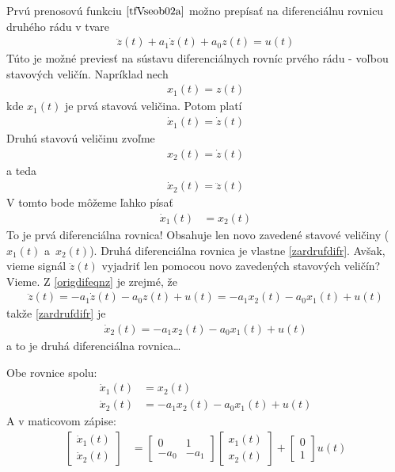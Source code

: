 \documentclass[a4paper, 10pt, ]{article}
\begin{document}
Prvú prenosovú funkciu $\eqref{tfVseob02a}$ možno prepísať na diferenciálnu rovnicu druhého rádu v tvare
\begin{align} \label{origdifeqnz}
	\ddot z(t) + a_1 \dot z(t) + a_0 z(t) = u(t)
\end{align}
Túto je možné previesť na sústavu diferenciálnych rovníc prvého rádu - voľbou stavových veličín. Napríklad nech
\begin{align}
	x_1(t) = z(t)
\end{align}
kde $x_1(t)$ je prvá stavová veličina. Potom platí
\begin{align}
	\dot x_1(t) = \dot z(t)
\end{align}
Druhú stavovú veličinu zvoľme
\begin{align}
	x_2(t) = \dot z(t)
\end{align}
a teda
\begin{align} \label{zardrufdifr}
	\dot x_2(t) = \ddot z(t)
\end{align}
V tomto bode môžeme ľahko písať
\begin{align}
	\dot x_1(t) &= x_2(t)
\end{align}
To je prvá diferenciálna rovnica! Obsahuje len novo zavedené stavové veličiny ($x_1(t)$ a~$x_2(t)$). Druhá diferenciálna rovnica je vlastne \eqref{zardrufdifr}. Avšak, vieme signál $\ddot z(t)$ vyjadriť len pomocou novo zavedených stavových veličín? Vieme. Z \eqref{origdifeqnz} je zrejmé, že
\begin{align}
	\ddot z(t) = - a_1 \dot z(t) - a_0 z(t) + u(t) = - a_1 x_2(t) - a_0 x_1(t) + u(t)
\end{align}
takže \eqref{zardrufdifr} je
\begin{align}
	\dot x_2(t) =  - a_1 x_2(t) - a_0 x_1(t) + u(t)
\end{align}
a to je druhá diferenciálna rovnica\ldots

Obe rovnice spolu:
\begin{align}
    \dot x_1(t) &= x_2(t) \\
	\dot x_2(t) &=  - a_1 x_2(t) - a_0 x_1(t) + u(t)
\end{align}
A v maticovom zápise:
\begin{align}
	\begin{bmatrix}
    	  \dot x_1(t) \\
		  \dot x_2(t)
 	\end{bmatrix}
	&=
	\begin{bmatrix}
    	0 & 1 \\
    	- a_0 & - a_1
  	\end{bmatrix}
    \begin{bmatrix}
    	  x_1(t) \\
		  x_2(t)
 	\end{bmatrix}
    +
    \begin{bmatrix}
    	  0 \\
		  1
 	\end{bmatrix}
    u(t)
\end{align}
\end{document}
